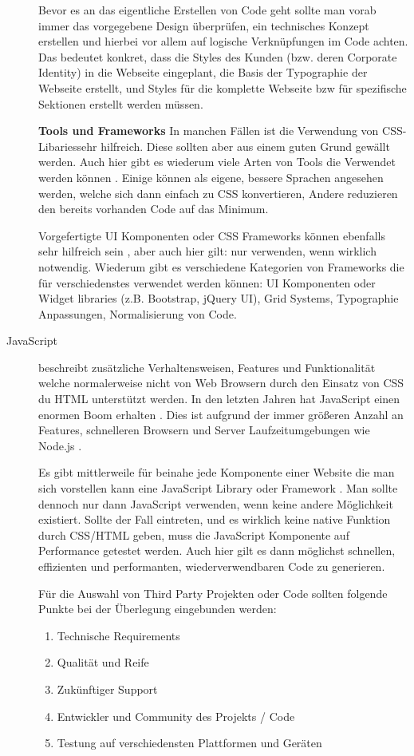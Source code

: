 \begin{description}
Bevor es an das eigentliche Erstellen von Code geht sollte man vorab immer das vorgegebene Design überprüfen, ein technisches Konzept erstellen und hierbei vor allem auf logische Verknüpfungen im Code achten. Das bedeutet konkret, dass die Styles des Kunden (bzw. deren Corporate Identity) in die Webseite eingeplant, die Basis der Typographie der Webseite erstellt, und Styles für die komplette Webseite bzw für spezifische Sektionen erstellt werden müssen.

\textbf{Tools und Frameworks\newline}
In manchen Fällen ist die Verwendung von CSS-Libariessehr hilfreich. Diese sollten aber aus einem guten Grund gewällt werden. Auch hier gibt es wiederum viele Arten von Tools die Verwendet werden können \cite{MELD.CH3-web-app.css3}. Einige können als eigene, bessere Sprachen angesehen werden, welche sich dann einfach zu CSS konvertieren, Andere reduzieren den bereits vorhanden Code auf das Minimum.

Vorgefertigte UI Komponenten oder CSS Frameworks können ebenfalls sehr hilfreich sein \cite{MELD.CH3-web-app.css3}, aber auch hier gilt: nur verwenden, wenn wirklich notwendig. Wiederum gibt es verschiedene Kategorien von Frameworks die für verschiedenstes verwendet werden können: UI Komponenten oder Widget libraries (z.B. Bootstrap, jQuery UI), Grid Systems, Typographie Anpassungen, Normalisierung von Code.


\item[JavaScript\newline]
beschreibt zusätzliche Verhaltensweisen, Features und Funktionalität welche normalerweise nicht von Web Browsern durch den Einsatz von CSS du HTML unterstützt werden. In den letzten Jahren hat JavaScript einen enormen Boom erhalten \cite{MELD.CH3-web-app.js2}. Dies ist aufgrund der immer größeren Anzahl an Features, schnelleren Browsern und Server Laufzeitumgebungen wie Node.js \cite{MELD.CH3-web-app.js1}. 

Es gibt mittlerweile für beinahe jede Komponente einer Website die man sich vorstellen kann eine JavaScript Library oder Framework \cite{MELD.CH3-web-app.js3}. Man sollte dennoch nur dann JavaScript verwenden, wenn keine andere Möglichkeit existiert.  Sollte der Fall eintreten, und es wirklich keine native Funktion durch CSS/HTML geben, muss die JavaScript Komponente auf Performance getestet werden. Auch hier gilt es dann möglichst schnellen, effizienten und performanten, wiederverwendbaren Code zu generieren. 

Für die Auswahl von Third Party Projekten oder Code sollten folgende Punkte bei der Überlegung eingebunden werden:
\begin{enumerate}
\item Technische Requirements 
\item Qualität und Reife
\item Zukünftiger Support
\item Entwickler und Community des Projekts / Code
\item Testung auf verschiedensten Plattformen und Geräten
\end{enumerate}


\end{description}
